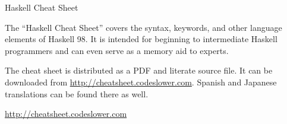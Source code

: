\begin{hcarentry}{Haskell Cheat Sheet}
\makeheader

The ``Haskell Cheat Sheet'' covers the syntax, keywords, and other
language elements of Haskell 98. It is intended for beginning to
intermediate Haskell programmers and can even serve as a memory aid to
experts.

The cheat sheet is distributed as a PDF and literate source file. It
can be downloaded from \url{http://cheatsheet.codeslower.com}.
Spanish and Japanese translations can be found there as well.

\FurtherReading
  \url{http://cheatsheet.codeslower.com}
\end{hcarentry}
